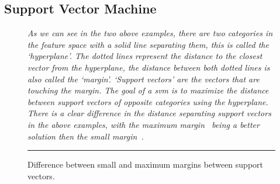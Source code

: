 \subsection{Support Vector Machine}
\label{subsec:background_support_vector_machine}
\begin{figure}[!tb]
  \centering
  \qquad
  \caption{Difference between small and maximum margins between support vectors.}
  \vspace{1mm}
  \footnotesize{\emph{As we can see in the two above examples, there are two categories in the feature space with a solid line separating them, this is called the `hyperplane'. The dotted lines represent the distance to the closest vector from the hyperplane, the distance between both dotted lines is also called the `margin'. `Support vectors' are the vectors that are touching the margin. The goal of a \gls{svm} is to maximize the distance between support vectors of opposite categories using the hyperplane. There is a clear difference in the distance separating support vectors in the above examples, with the maximum margin~ being a better solution then the small margin~.}}
  \vspace{2mm}
  \hrule
  \label{fig:SVM_margin}
\end{figure}

